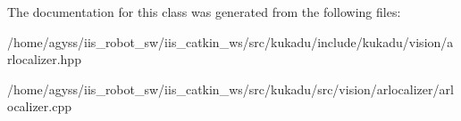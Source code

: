 The documentation for this class was generated from the following files\+:\begin{DoxyCompactItemize}
\item 
/home/agyss/iis\+\_\+robot\+\_\+sw/iis\+\_\+catkin\+\_\+ws/src/kukadu/include/kukadu/vision/arlocalizer.\+hpp\item 
/home/agyss/iis\+\_\+robot\+\_\+sw/iis\+\_\+catkin\+\_\+ws/src/kukadu/src/vision/arlocalizer/arlocalizer.\+cpp\end{DoxyCompactItemize}
